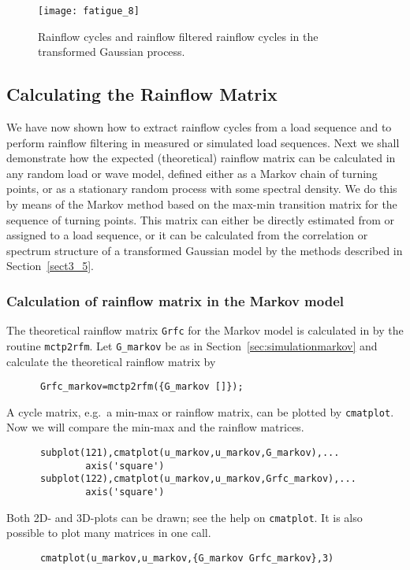 \begin{figure}
\centering
\texttt{[image: fatigue\_8]}
\vspace{-3mm}
\caption[Rainflow cycles and rainflow filtered rainflow cycles]{
Rainflow cycles and rainflow filtered rainflow cycles in
the transformed Gaussian process.}
\label{fig_wafo_6.16}
\end{figure}


\subsection{Calculating the Rainflow Matrix}
\label{sec:calrainflowmatrix}

We have now shown how to extract rainflow cycles from a load
sequence and to perform rainflow filtering in measured or
simulated load sequences. Next we shall
demonstrate how the expected (theoretical) rainflow matrix can be
calculated in any random load or wave model, defined either as a
Markov chain of turning points, or as a stationary random process
with some spectral density.
We do this by means of the Markov method based on the max-min
transition matrix for the sequence of turning points.
This matrix can either be directly estimated from
or assigned to a load sequence, or it can be calculated from the
correlation or spectrum structure of a transformed Gaussian model
by the methods described in Section~\ref{sect3_5}.

\subsubsection{Calculation of rainflow matrix in the Markov model}
\label{sec:calrfcmatrixinmarkovmodel}

The theoretical rainflow matrix \verb+Grfc+ for the Markov model is
calculated in \progname{} by the routine
\verb+mctp2rfm+.
Let \verb+G_markov+ be as in Section~\ref{sec:simulationmarkov} and
calculate the theoretical rainflow matrix by
{\small\begin{verbatim}
      Grfc_markov=mctp2rfm({G_markov []});
\end{verbatim}}

A cycle matrix, e.g.\ a min-max or rainflow matrix, can be
plotted by \verb+cmatplot+.
Now we will compare the min-max and the rainflow matrices.
{\small\begin{verbatim}
      subplot(121),cmatplot(u_markov,u_markov,G_markov),...
              axis('square')
      subplot(122),cmatplot(u_markov,u_markov,Grfc_markov),...
              axis('square')
\end{verbatim}}
Both 2D- and 3D-plots can be drawn;
see the help on \verb+cmatplot+. 
It is also possible to plot many matrices in one call.
{\small\begin{verbatim}
      cmatplot(u_markov,u_markov,{G_markov Grfc_markov},3)
\end{verbatim}}

